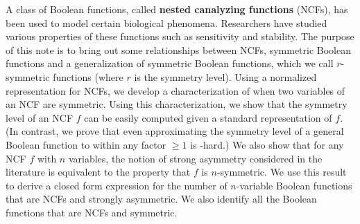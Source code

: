 A class of Boolean functions, 
called \textbf{nested canalyzing functions} (NCFs),
has been used to model certain biological phenomena.
Researchers have studied various properties of these functions
such as sensitivity and stability.
The purpose of this note is to bring out some relationships between NCFs, symmetric 
Boolean functions and a generalization of symmetric Boolean functions,
which we call $r$-symmetric functions (where $r$ is the symmetry level).
Using a normalized representation for NCFs, we develop a 
characterization of when two variables of an NCF are symmetric.
Using this characterization, we show 
that the symmetry level of an NCF $f$
can be easily computed given a standard representation of $f$.
(In contrast, we prove that even approximating the symmetry level of
a general Boolean function to within any factor $\geq 1$ is \cnp-hard.) 
We also show that for any NCF $f$ with $n$ variables, the notion of
strong asymmetry considered in the literature is equivalent to
the property that $f$ is $n$-symmetric. 
We use this result to derive a closed form expression for the
number of $n$-variable Boolean functions 
that are NCFs and strongly asymmetric.
We also identify all the Boolean functions that are NCFs 
and symmetric. 
